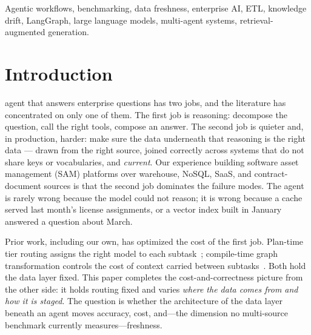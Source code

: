 \documentclass{ieeeaccess}
\begin{document}
\begin{keywords}
Agentic workflows, benchmarking, data freshness, enterprise AI, ETL, knowledge
drift, LangGraph, large language models, multi-agent systems, retrieval-augmented
generation.
\end{keywords}

\titlepgskip=-15pt

\maketitle

\section{Introduction}
\label{sec:intro}

 agent that answers enterprise questions has two jobs, and the
literature has concentrated on only one of them. The first job is reasoning: decompose
the question, call the right tools, compose an answer. The second job is quieter and,
in production, harder: make sure the data underneath that reasoning is the right data
--- drawn from the right source, joined correctly across systems that do not share
keys or vocabularies, and \emph{current}. Our experience building software asset
management (SAM) platforms over warehouse, NoSQL, SaaS, and contract-document sources
is that the second job dominates the failure modes. The agent is rarely wrong because
the model could not reason; it is wrong because a cache served last month's license
assignments, or a vector index built in January answered a question about March.

Prior work, including our own, has optimized the cost of the first job. Plan-time
tier routing assigns the right model to each subtask~\cite{par}; compile-time graph
transformation controls the cost of context carried between subtasks~\cite{tca}.
Both hold the data layer fixed. This paper completes the cost-and-correctness picture
from the other side: it holds routing fixed and varies \emph{where the data comes from
and how it is staged}. The question is whether the architecture of the data layer
beneath an agent moves accuracy, cost, and---the dimension no multi-source benchmark
currently measures---freshness.
\end{document}
